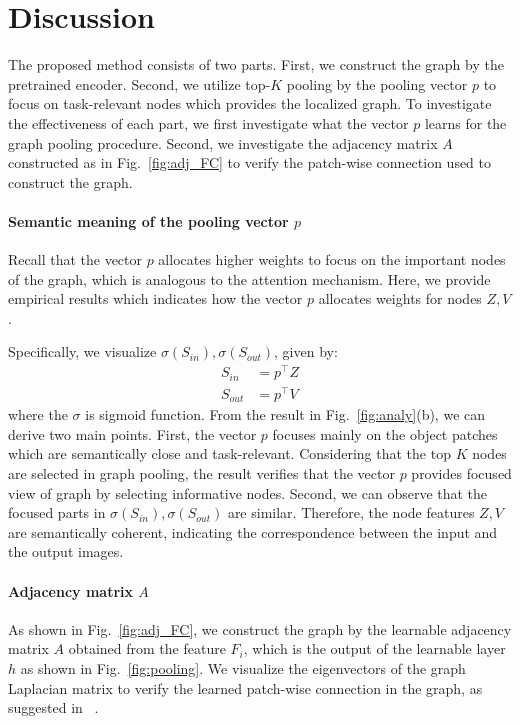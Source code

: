 \documentclass[letterpaper]{article} %
\begin{document}
\section{Discussion}

The proposed method consists of two parts. First, we construct the graph by the pretrained encoder. Second, we utilize top-$K$ pooling by the pooling vector $p$ to focus on task-relevant nodes which provides the localized graph.
To investigate the effectiveness of each part, we first investigate what the vector $p$ learns for the graph pooling procedure.
Second, we investigate the adjacency matrix $A$ constructed as in Fig.~\ref{fig:adj_FC}
to verify the patch-wise connection used to construct the graph.



\paragraph{Semantic meaning of the pooling vector $p$ }
Recall that the vector $p$ allocates higher weights to focus on the important nodes of the graph, which is analogous to the attention mechanism.
Here, we provide empirical results which indicates how the vector $p$ allocates weights for nodes $Z, V$.


Specifically, we visualize $\sigma(S_{in}), \sigma(S_{out})$, given by:
\begin{align}
	S_{in} &= p^\top Z \\
	S_{out} &= p^\top V
\end{align}
where the $\sigma$ is sigmoid function.
From the result in Fig.~\ref{fig:analy}(b), we can derive two main points.
First, the vector $p$ focuses mainly on the object patches which are semantically close and task-relevant.
Considering that the top $K$ nodes are selected in graph pooling, the result verifies that the vector $p$ provides focused view of graph by selecting informative nodes.
Second, we can observe that the focused parts in $\sigma(S_{in}), \sigma(S_{out})$ are similar. Therefore, the node features $Z, V$ are semantically coherent, indicating the correspondence between the input and the output images.




\paragraph{Adjacency matrix $A$}
As shown in Fig.~\ref{fig:adj_FC},
we construct the graph by the learnable adjacency matrix $A$ obtained from the feature $F_i$, which is the output of the learnable layer $h$ as shown in Fig.~\ref{fig:pooling}. We visualize the eigenvectors of the graph Laplacian matrix to verify the learned patch-wise connection in the graph, as suggested in ~\cite{deepSpectral}.
\end{document}
